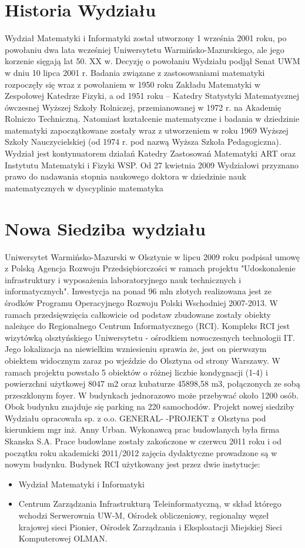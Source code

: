 \documentclass[a4paper,12pt]{article}
\begin{document}
\section {Historia Wydziału}
Wydział Matematyki i Informatyki został utworzony 1 września 2001 roku, po powołaniu dwa lata wcześniej
Uniwersytetu Warmińsko-Mazurskiego, ale jego korzenie sięgają lat 50. XX w. Decyzję o powołaniu Wydziału
podjął Senat UWM w dniu 10 lipca 2001 r. Badania związane z zastosowaniami matematyki rozpoczęły się
wraz z powołaniem w 1950 roku Zakładu Matematyki w Zespołowej Katedrze Fizyki, a od 1951 roku –
Katedry Statystyki Matematycznej ówczesnej Wyższej Szkoły Rolniczej, przemianowanej w 1972 r. na
Akademię Rolniczo Techniczną. Natomiast kształcenie matematyczne i badania w dziedzinie matematyki
zapoczątkowane zostały wraz z utworzeniem w roku 1969 Wyższej Szkoły Nauczycielskiej (od 1974 r. pod
nazwą Wyższa Szkoła Pedagogiczna). Wydział jest kontynuatorem działań Katedry Zastosowań Matematyki
ART oraz Instytutu Matematyki i Fizyki WSP.
Od 27 kwietnia 2009 Wydziałowi przyznano prawo do nadawania stopnia naukowego doktora w dziedzinie
nauk matematycznych w dyscyplinie matematyka

\section {Nowa Siedziba wydziału}
Uniwersytet Warmińsko-Mazurski w Olsztynie w lipcu 2009 roku podpisał umowę z Polską Agencja Rozwoju
Przedsiębiorczości w ramach projektu "Udoskonalenie infrastruktury i wyposażenia laboratoryjnego nauk
technicznych i informatycznych". Inwestycja na ponad 96 mln złotych realizowana jest ze środków Programu
Operacyjnego Rozwoju Polski Wschodniej 2007-2013. W ramach przedsięwzięcia całkowicie od podstaw
zbudowane zostały obiekty należące do Regionalnego Centrum Informatycznego (RCI).
Kompleks RCI jest wizytówką olsztyńskiego Uniwersytetu - ośrodkiem nowoczesnych technologii IT. Jego
lokalizacja na niewielkim wzniesieniu sprawia że, jest on pierwszym obiektem widocznym zaraz po wjeździe
do Olsztyna od strony Warszawy. W ramach projektu powstało 5 obiektów o różnej liczbie kondygnacji (1-4) i
powierzchni użytkowej 8047 m2 oraz kubaturze 45898,58 m3, połączonych ze sobą przeszklonym foyer. W
budynkach jednorazowo może przebywać około 1200 osób. Obok budynku znajduje się parking na 220
samochodów.
Projekt nowej siedziby Wydziału opracowała sp. z o.o. GENERAL- -PROJEKT z Olsztyna pod kierunkiem mgr
inż. Anny Urban. Wykonawcą prac budowlanych była firma Skanska S.A. Prace budowlane zostały
zakończone w czerwcu 2011 roku i od początku roku akademicki 2011/2012 zajęcia dydaktyczne prowadzone
są w nowym budynku.
Budynek RCI użytkowany jest przez dwie instytucje:
\begin {itemize}
\item Wydział Matematyki i Informatyki
\item Centrum Zarządzania Infrastrukturą Teleinformatyczną, w skład którego wchodzi Serwerownia UW-M,
Ośrodek obliczeniowy, regionalny węzeł krajowej sieci Pionier, Ośrodek Zarządzania i Eksploatacji
Miejskiej Sieci Komputerowej OLMAN.
\end{itemize}
\end{document}
